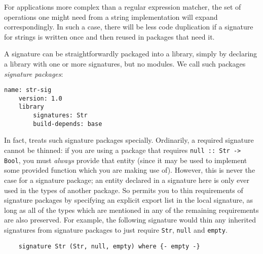 For applications more complex than a regular expression matcher, the set
of operations one might need from a string implementation will expand
correspondingly.  In such a case, there will be less code duplication if
a signature for strings is written once and then reused in packages that
need it.

A signature can be straightforwardly packaged into a library, simply
by declaring a library with one or more signatures, but no modules.
We call such packages \emph{signature packages}:

\begin{lstlisting}[language=Cabal]
    name: str-sig
    version: 1.0
    library
        signatures: Str
        build-depends: base
\end{lstlisting}

\noindent
In fact, \Backpack{} treats such signature packages specially.
Ordinarily, a required signature cannot be thinned: if you are using a
package that requires \verb|null :: Str -> Bool|, you must \emph{always}
provide that entity (since it may be used to implement some provided
function which you are making use of).  However, this is never the case
for a signature package; an entity declared in a signature here is only
ever used in the types of another package.  So \Backpack{} permits you
to thin requirements of signature packages by specifying an explicit
export list in the local signature, as long as all of the types which
are mentioned in any of the remaining requirements are also preserved.
For example, the following signature would thin any inherited signatures
from signature packages to just require \verb|Str|, \verb|null| and
\verb|empty|.

\begin{lstlisting}
    signature Str (Str, null, empty) where {- empty -}
\end{lstlisting}

